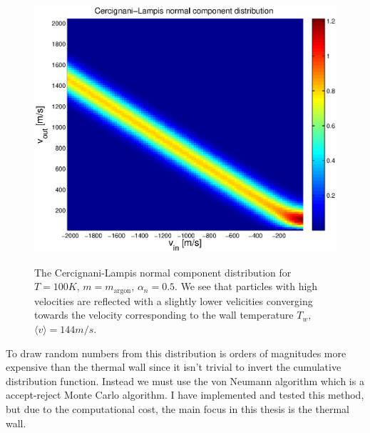 \begin{figure}[h]
\begin{center}
\includegraphics[width=\textwidth, trim=0cm 0cm 0cm 0cm, clip]{DSMC/figures/cercignani-lampis.eps}
\label{fig:cercignani_lampis}
\end{center}
\caption{The Cercignani-Lampis normal component distribution for $T=100K$, $m=m_{\text{argon}}$, $\alpha_n=0.5$. We see that particles with high velocities are reflected with a slightly lower velicities converging towards the velocity corresponding to the wall temperature $T_w$, $\langle v \rangle = 144m/s$.}
\end{figure}
To draw random numbers from this distribution is orders of magnitudes more expensive than the thermal wall since it isn't trivial to invert the cumulative distribution function. Instead we must use the von Neumann algorithm which is a accept-reject Monte Carlo algorithm\cite{allen1989computer}. I have implemented and tested this method, but due to the computational cost, the main focus in this thesis is the thermal wall. 